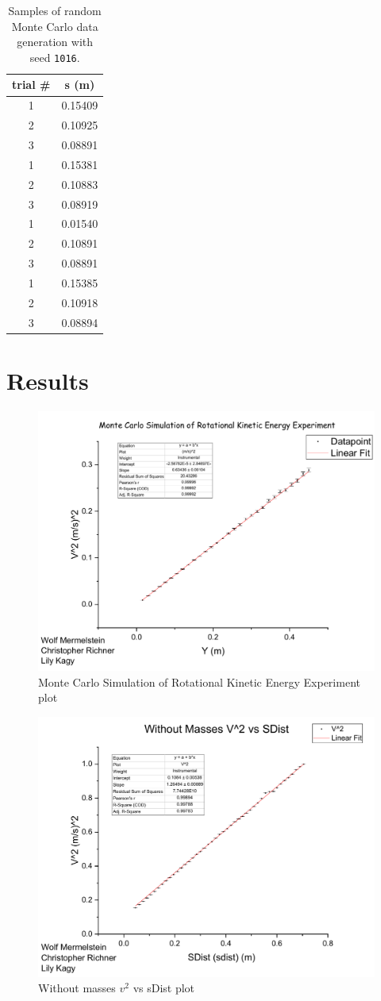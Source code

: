 \documentclass[coverpage]{article}
\begin{document}
	\begin{table}[h]
		\centering
		\caption{Samples of random Monte Carlo data generation with seed \texttt{1016}.}
		\begin{tabular}{c|c}
			trial \# & s (m) \\ \hline
			1 & 0.15409 \\
			2 & 0.10925 \\
			3 & 0.08891 \\ \hline
			1 & 0.15381 \\
			2 & 0.10883 \\
			3 & 0.08919 \\ \hline
			1 & 0.01540 \\
			2 & 0.10891 \\
			3 & 0.08891 \\ \hline
			1 & 0.15385 \\
			2 & 0.10918 \\
			3 & 0.08894 \\
		\end{tabular}
	\end{table}
	
	\section{Results}
	
	\begin{figure}[h]
		\centering
		\caption{Monte Carlo Simulation of Rotational Kinetic Energy Experiment plot}
		\label{fig:monte-carlo-simulation}
		\includegraphics[width=.5\textwidth]{plots/monteCarloPlot.pdf}
	\end{figure}
	
	\begin{figure}[h]
		\centering
		\caption{Without masses $v^2$ vs sDist plot}
		\label{fig:plot-without-masses}
		\includegraphics[width=.5\textwidth]{plots/withMassesPlot.pdf}
	\end{figure}
\end{document}
